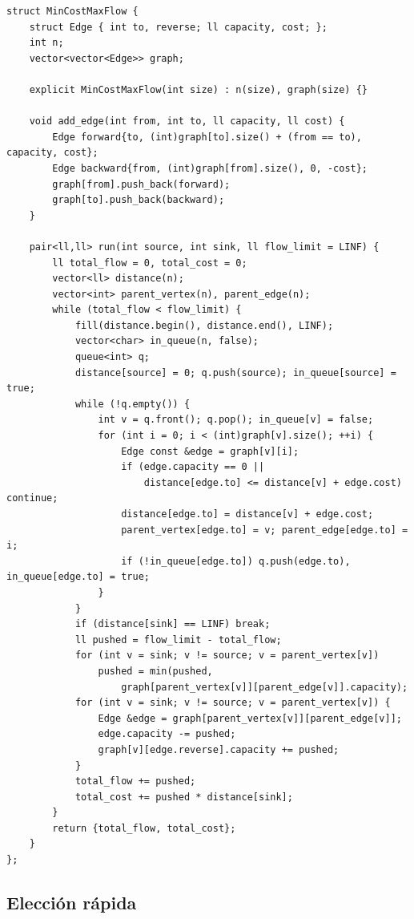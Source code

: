 \begin{lstlisting}[style=cpp]
struct MinCostMaxFlow {
    struct Edge { int to, reverse; ll capacity, cost; };
    int n;
    vector<vector<Edge>> graph;

    explicit MinCostMaxFlow(int size) : n(size), graph(size) {}

    void add_edge(int from, int to, ll capacity, ll cost) {
        Edge forward{to, (int)graph[to].size() + (from == to), capacity, cost};
        Edge backward{from, (int)graph[from].size(), 0, -cost};
        graph[from].push_back(forward);
        graph[to].push_back(backward);
    }

    pair<ll,ll> run(int source, int sink, ll flow_limit = LINF) {
        ll total_flow = 0, total_cost = 0;
        vector<ll> distance(n);
        vector<int> parent_vertex(n), parent_edge(n);
        while (total_flow < flow_limit) {
            fill(distance.begin(), distance.end(), LINF);
            vector<char> in_queue(n, false);
            queue<int> q;
            distance[source] = 0; q.push(source); in_queue[source] = true;
            while (!q.empty()) {
                int v = q.front(); q.pop(); in_queue[v] = false;
                for (int i = 0; i < (int)graph[v].size(); ++i) {
                    Edge const &edge = graph[v][i];
                    if (edge.capacity == 0 ||
                        distance[edge.to] <= distance[v] + edge.cost) continue;
                    distance[edge.to] = distance[v] + edge.cost;
                    parent_vertex[edge.to] = v; parent_edge[edge.to] = i;
                    if (!in_queue[edge.to]) q.push(edge.to), in_queue[edge.to] = true;
                }
            }
            if (distance[sink] == LINF) break;
            ll pushed = flow_limit - total_flow;
            for (int v = sink; v != source; v = parent_vertex[v])
                pushed = min(pushed,
                    graph[parent_vertex[v]][parent_edge[v]].capacity);
            for (int v = sink; v != source; v = parent_vertex[v]) {
                Edge &edge = graph[parent_vertex[v]][parent_edge[v]];
                edge.capacity -= pushed;
                graph[v][edge.reverse].capacity += pushed;
            }
            total_flow += pushed;
            total_cost += pushed * distance[sink];
        }
        return {total_flow, total_cost};
    }
};
\end{lstlisting}


\subsection{Elecci\'on r\'apida}

